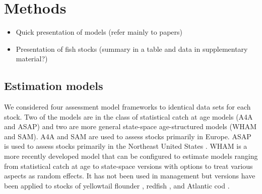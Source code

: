 \documentclass[12pt,letterpaper, leqno]{article}
\begin{document}

\section*{Methods}

\begin{itemize}
\item Quick presentation of models (refer mainly to papers)
\item Presentation of fish stocks (summary in a table and data in supplementary material?)
\end{itemize}

\subsection*{Estimation models}

We considered four assessment model frameworks to identical data sets for each stock. Two of the models are in the class of statistical catch at age models (A4A and ASAP) and two are more general state-space age-structured models (WHAM and SAM). A4A \citep{jardimetal15} and SAM \citep{nielsen2014estimation} are used to assess stocks primarily in Europe. ASAP is used to assess stocks primarily in the Northeast United States \citep{legaultrestrepo99}. WHAM is a more recently developed model that can be configured to estimate models ranging from statistical catch at age to state-space versions with options to treat various aspects as random effects. It has not been used in management but versions have been applied to stocks of yellowtail flounder \citep{milleretal16}, redfish \citep{millerhyun18}, and Atlantic cod \citep{milleretal18}. 
\end{document}
